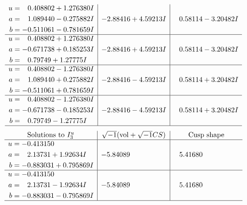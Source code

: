 \documentclass[1p]{elsarticle_modified}
\theoremstyle{definition}
\newcommand{\I}{\sqrt{-1}}
\begin{document}
$$\begin{array}{c|c|c}
\begin{aligned}
u &= \phantom{-}0.408802 + 1.276380 I \\
a &= \phantom{-}1.089440 - 0.275882 I \\
b &= -0.511061 - 0.781659 I\end{aligned}
 & -2.88416 + 4.59213 I & \phantom{-}0.58114 - 3.20482 I \\ \hline\begin{aligned}
u &= \phantom{-}0.408802 + 1.276380 I \\
a &= -0.671738 + 0.185253 I \\
b &= \phantom{-}0.79749 + 1.27775 I\end{aligned}
 & -2.88416 + 4.59213 I & \phantom{-}0.58114 - 3.20482 I \\ \hline\begin{aligned}
u &= \phantom{-}0.408802 - 1.276380 I \\
a &= \phantom{-}1.089440 + 0.275882 I \\
b &= -0.511061 + 0.781659 I\end{aligned}
 & -2.88416 - 4.59213 I & \phantom{-}0.58114 + 3.20482 I \\ \hline\begin{aligned}
u &= \phantom{-}0.408802 - 1.276380 I \\
a &= -0.671738 - 0.185253 I \\
b &= \phantom{-}0.79749 - 1.27775 I\end{aligned}
 & -2.88416 - 4.59213 I & \phantom{-}0.58114 + 3.20482 I\\
 \hline 
 \end{array}$$\newpage$$\begin{array}{c|c|c}  
\text{Solutions to }I^u_{3}& \I (\text{vol} + \sqrt{-1}CS) & \text{Cusp shape}\\
 \hline 
\begin{aligned}
u &= -0.413150\phantom{ +0.000000I} \\
a &= \phantom{-}2.13731 + 1.92634 I \\
b &= -0.883031 + 0.795869 I\end{aligned}
 & -5.84089\phantom{ +0.000000I} & \phantom{-}5.41680\phantom{ +0.000000I} \\ \hline\begin{aligned}
u &= -0.413150\phantom{ +0.000000I} \\
a &= \phantom{-}2.13731 - 1.92634 I \\
b &= -0.883031 - 0.795869 I\end{aligned}
 & -5.84089\phantom{ +0.000000I} & \phantom{-}5.41680\phantom{ +0.000000I}\\
 \hline 
 \end{array}$$\newpage
\end{document}
